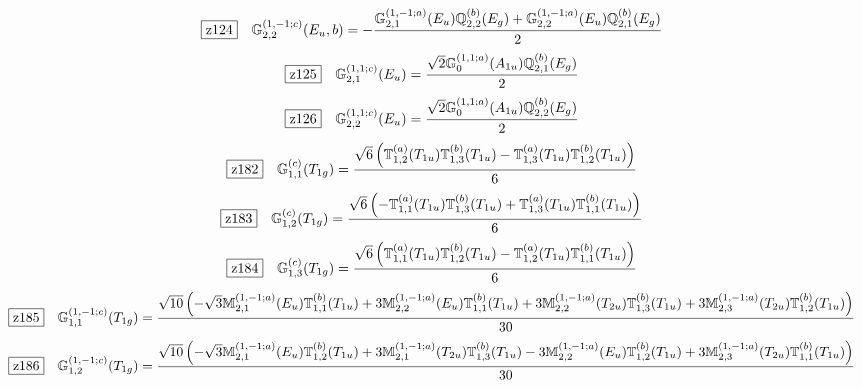 \documentclass[fleqn,10pt,landscape]{jsarticle}
\begin{document}
\begin{dmath*}
\hspace*{3mm}\fbox{z124}\quad \mathbb{G}_{2,2}^{(1,-1;c)}(E_{u},b)=- \frac{\mathbb{G}_{2,1}^{(1,-1;a)}(E_{u}) \mathbb{Q}_{2,2}^{(b)}(E_{g}) + \mathbb{G}_{2,2}^{(1,-1;a)}(E_{u}) \mathbb{Q}_{2,1}^{(b)}(E_{g})}{2}
\end{dmath*}
\begin{dmath*}
\hspace*{3mm}\fbox{z125}\quad \mathbb{G}_{2,1}^{(1,1;c)}(E_{u})=\frac{\sqrt{2} \mathbb{G}_{0}^{(1,1;a)}(A_{1u}) \mathbb{Q}_{2,1}^{(b)}(E_{g})}{2}
\end{dmath*}
\begin{dmath*}
\hspace*{3mm}\fbox{z126}\quad \mathbb{G}_{2,2}^{(1,1;c)}(E_{u})=\frac{\sqrt{2} \mathbb{G}_{0}^{(1,1;a)}(A_{1u}) \mathbb{Q}_{2,2}^{(b)}(E_{g})}{2}
\end{dmath*}
\begin{dmath*}
\hspace*{3mm}\fbox{z182}\quad \mathbb{G}_{1,1}^{(c)}(T_{1g})=\frac{\sqrt{6} \left(\mathbb{T}_{1,2}^{(a)}(T_{1u}) \mathbb{T}_{1,3}^{(b)}(T_{1u}) - \mathbb{T}_{1,3}^{(a)}(T_{1u}) \mathbb{T}_{1,2}^{(b)}(T_{1u})\right)}{6}
\end{dmath*}
\begin{dmath*}
\hspace*{3mm}\fbox{z183}\quad \mathbb{G}_{1,2}^{(c)}(T_{1g})=\frac{\sqrt{6} \left(- \mathbb{T}_{1,1}^{(a)}(T_{1u}) \mathbb{T}_{1,3}^{(b)}(T_{1u}) + \mathbb{T}_{1,3}^{(a)}(T_{1u}) \mathbb{T}_{1,1}^{(b)}(T_{1u})\right)}{6}
\end{dmath*}
\begin{dmath*}
\hspace*{3mm}\fbox{z184}\quad \mathbb{G}_{1,3}^{(c)}(T_{1g})=\frac{\sqrt{6} \left(\mathbb{T}_{1,1}^{(a)}(T_{1u}) \mathbb{T}_{1,2}^{(b)}(T_{1u}) - \mathbb{T}_{1,2}^{(a)}(T_{1u}) \mathbb{T}_{1,1}^{(b)}(T_{1u})\right)}{6}
\end{dmath*}
\begin{dmath*}
\hspace*{3mm}\fbox{z185}\quad \mathbb{G}_{1,1}^{(1,-1;c)}(T_{1g})=\frac{\sqrt{10} \left(- \sqrt{3} \mathbb{M}_{2,1}^{(1,-1;a)}(E_{u}) \mathbb{T}_{1,1}^{(b)}(T_{1u}) + 3 \mathbb{M}_{2,2}^{(1,-1;a)}(E_{u}) \mathbb{T}_{1,1}^{(b)}(T_{1u}) + 3 \mathbb{M}_{2,2}^{(1,-1;a)}(T_{2u}) \mathbb{T}_{1,3}^{(b)}(T_{1u}) + 3 \mathbb{M}_{2,3}^{(1,-1;a)}(T_{2u}) \mathbb{T}_{1,2}^{(b)}(T_{1u})\right)}{30}
\end{dmath*}
\begin{dmath*}
\hspace*{3mm}\fbox{z186}\quad \mathbb{G}_{1,2}^{(1,-1;c)}(T_{1g})=\frac{\sqrt{10} \left(- \sqrt{3} \mathbb{M}_{2,1}^{(1,-1;a)}(E_{u}) \mathbb{T}_{1,2}^{(b)}(T_{1u}) + 3 \mathbb{M}_{2,1}^{(1,-1;a)}(T_{2u}) \mathbb{T}_{1,3}^{(b)}(T_{1u}) - 3 \mathbb{M}_{2,2}^{(1,-1;a)}(E_{u}) \mathbb{T}_{1,2}^{(b)}(T_{1u}) + 3 \mathbb{M}_{2,3}^{(1,-1;a)}(T_{2u}) \mathbb{T}_{1,1}^{(b)}(T_{1u})\right)}{30}
\end{dmath*}
\end{document}
